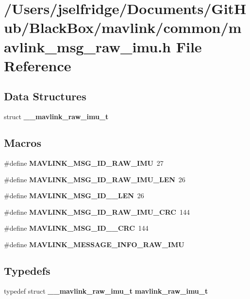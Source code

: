 \section{/\+Users/jselfridge/\+Documents/\+Git\+Hub/\+Black\+Box/mavlink/common/mavlink\+\_\+msg\+\_\+raw\+\_\+imu.h File Reference}
\label{mavlink__msg__raw__imu_8h}
\subsection*{Data Structures}
\begin{DoxyCompactItemize}
\item 
struct \textbf{ \+\_\+\+\_\+mavlink\+\_\+raw\+\_\+imu\+\_\+t}
\end{DoxyCompactItemize}
\subsection*{Macros}
\begin{DoxyCompactItemize}
\item 
\#define \textbf{ M\+A\+V\+L\+I\+N\+K\+\_\+\+M\+S\+G\+\_\+\+I\+D\+\_\+\+R\+A\+W\+\_\+\+I\+MU}~27
\item 
\#define \textbf{ M\+A\+V\+L\+I\+N\+K\+\_\+\+M\+S\+G\+\_\+\+I\+D\+\_\+\+R\+A\+W\+\_\+\+I\+M\+U\+\_\+\+L\+EN}~26
\item 
\#define \textbf{ M\+A\+V\+L\+I\+N\+K\+\_\+\+M\+S\+G\+\_\+\+I\+D\+\_\+\_\+\+L\+EN}~26
\item 
\#define \textbf{ M\+A\+V\+L\+I\+N\+K\+\_\+\+M\+S\+G\+\_\+\+I\+D\+\_\+\+R\+A\+W\+\_\+\+I\+M\+U\+\_\+\+C\+RC}~144
\item 
\#define \textbf{ M\+A\+V\+L\+I\+N\+K\+\_\+\+M\+S\+G\+\_\+\+I\+D\+\_\+\_\+\+C\+RC}~144
\item 
\#define \textbf{ M\+A\+V\+L\+I\+N\+K\+\_\+\+M\+E\+S\+S\+A\+G\+E\+\_\+\+I\+N\+F\+O\+\_\+\+R\+A\+W\+\_\+\+I\+MU}
\end{DoxyCompactItemize}
\subsection*{Typedefs}
\begin{DoxyCompactItemize}
\item 
typedef struct \textbf{ \+\_\+\+\_\+mavlink\+\_\+raw\+\_\+imu\+\_\+t} \textbf{ mavlink\+\_\+raw\+\_\+imu\+\_\+t}
\end{DoxyCompactItemize}


